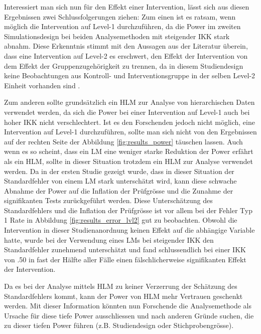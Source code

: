 \documentclass[12pt]{article}\usepackage[]{graphicx}\usepackage[]{color}
\begin{document}
Interessiert man sich nun für den Effekt einer Intervention, lässt sich aus diesen Ergebnissen zwei Schlussfolgerungen ziehen: Zum einen ist es ratsam, wenn möglich die Intervention auf Level-1 durchzuführen, da die Power im zweiten Simulationsdesign bei beiden Analysemethoden mit steigender IKK stark abnahm. Diese Erkenntnis stimmt mit den Aussagen aus der Literatur überein, dass eine Intervention auf Level-2 es erschwert, den Effekt der Intervention von dem Effekt der Gruppenzugehörigkeit zu trennen, da in diesem Studiendesign keine Beobachtungen aus Kontroll- und Interventionsgruppe in der selben Level-2 Einheit vorhanden sind \citep{cleary2012studydesign, moerbeek2000design}. 

Zum anderen sollte grundsätzlich ein HLM zur Analyse von hierarchischen Daten verwendet werden, da sich die Power bei einer Intervention auf Level-1 auch bei hoher IKK nicht verschlechtert. Ist es den Forschenden jedoch nicht möglich, eine Intervention auf Level-1 durchzuführen, sollte man sich nicht von den Ergebnissen auf der rechten Seite der Abbildung \ref{fig:results_power} täuschen lassen. Auch wenn es so scheint, dass ein LM eine weniger starke Reduktion der Power erfährt als ein HLM, sollte in dieser Situation trotzdem ein HLM zur Analyse verwendet werden. Da in der ersten Studie gezeigt wurde, dass in dieser Situation der Standardfehler von einem LM stark unterschätzt wird, kann diese schwache Abnahme der Power auf die Inflation der Prüfgrösse und die Zunahme der signifikanten Tests zurückgeführt werden. Diese Unterschätzung des Standardfehlers und die Inflation der Prüfgrösse ist vor allem bei der Fehler Typ 1 Rate in Abbildung \ref{fig:results_error_lvl2} gut zu beobachten. Obwohl die Intervention in dieser Studienanordnung keinen Effekt auf die abhängige Variable hatte, wurde bei der Verwendung eines LMs bei steigender IKK den Standardfehler zunehmend unterschätzt und fand schlussendlich bei einer IKK von .50 in fast der Hälfte aller Fälle einen fälschlicherweise signifikanten Effekt der Intervention.

Da es bei der Analyse mittels HLM zu keiner Verzerrung der Schätzung des Standardfehlers kommt, kann der Power von HLM mehr Vertrauen geschenkt werden. Mit dieser Information könnten nun Forschende die Analysemethode als Ursache für diese tiefe Power ausschliessen und nach anderen Gründe suchen, die zu dieser tiefen Power führen (z.B. Studiendesign oder Stichprobengrösse).
\end{document}
